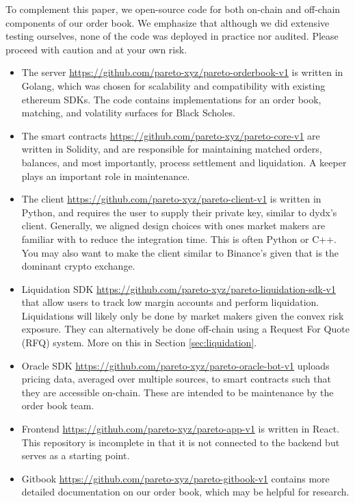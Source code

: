 \documentclass{article}
\begin{document}
To complement this paper, we open-source code for both on-chain and off-chain components of our order book. We emphasize that although we did extensive testing ourselves, none of the code was deployed in practice nor audited. Please proceed with caution and at your own risk.
\begin{itemize}
    \item The server \url{https://github.com/pareto-xyz/pareto-orderbook-v1} is written in Golang, which was chosen for scalability and compatibility with existing ethereum SDKs. The code contains implementations for an order book, matching, and volatility surfaces for Black Scholes.
    \item The smart contracts \url{https://github.com/pareto-xyz/pareto-core-v1} are written in Solidity, and are responsible for maintaining matched orders, balances, and most importantly, process settlement and liquidation. A keeper plays an important role in maintenance.
    \item  The client \url{https://github.com/pareto-xyz/pareto-client-v1} is written in Python, and requires the user to supply their private key, similar to dydx's client. Generally, we aligned design choices with ones market makers are familiar with to reduce the integration time. This is often Python or C++. You may also want to make the client similar to Binance's given that is the dominant crypto exchange.
   \item Liquidation SDK \url{https://github.com/pareto-xyz/pareto-liquidation-sdk-v1} that allow users to track low margin accounts and perform liquidation. Liquidations will likely only be done by market makers given the convex risk exposure. They can alternatively be done off-chain using a Request For Quote (RFQ) system. More on this in Section \ref{sec:liquidation}.
   \item Oracle SDK \url{https://github.com/pareto-xyz/pareto-oracle-bot-v1} uploads pricing data, averaged over multiple sources, to smart contracts such that they are accessible on-chain. These are intended to be maintenance by the order book team.
   \item Frontend \url{https://github.com/pareto-xyz/pareto-app-v1} is written in React. This repository is incomplete in that it is not connected to the backend but serves as a starting point. 
   \item Gitbook \url{https://github.com/pareto-xyz/pareto-gitbook-v1} contains more detailed documentation on our order book, which may be helpful for research.
\end{itemize}
\end{document}
